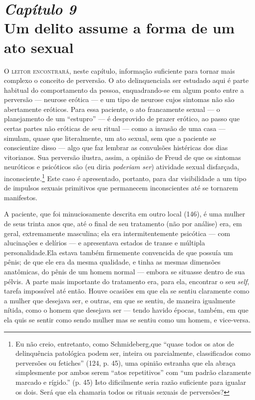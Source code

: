 \chapter[\textbf{9}\quad Um delito assume a forma de um ato sexual]{{\large\textit{Capítulo 9}}\\ Um delito assume a forma de um ato sexual}


\textsc{O leitor encontrará,} neste capítulo, informação suficiente para tornar
mais complexo o conceito de perversão. O ato delinquencial\idxcrime[|(] a ser
estudado aqui é parte habitual do comportamento da pessoa,
enquadrando-se em algum ponto entre a perversão --- neurose\idxneuro{} erótica
 --- e um tipo de neurose\idxpervneuro{} cujos sintomas não são abertamente eróticos.
Para essa paciente, o ato francamente sexual --- o planejamento de
um ``estupro''\idxestup{} --- é desprovido de prazer
erótico, ao passo que certas partes não eróticas de seu ritual ---
como a invasão de uma casa --- simulam, quase que literalmente, um ato
sexual, sem que a paciente se conscientize disso --- algo que faz
lembrar as convulsões histéricas dos dias vitorianos. Sua perversão
ilustra, assim, a opinião de Freud\idxfreud{} de que os sintomas neuróticos e
psicóticos são (eu diria \textit{poderiam ser}) atividade sexual
disfarçada, inconsciente.\footnote{ Eu não creio, entretanto, como
Schmideberg,\idxschmid[|nn] que ``quase todos os atos de delinquência
patológica podem ser, inteira ou parcialmente, classificados como
perversões ou fetiches'' (124, p. 45), uma opinião
estranha que ela abraça simplesmente por ambos serem
``atos repetitivos'' com ``um
padrão claramente marcado e rígido.'' (p. 45) Isto
dificilmente seria razão suficiente para igualar os dois. Será que ela
chamaria todos os rituais sexuais de perversões?} Este caso é
apresentado, portanto, para dar visibilidade a um tipo de impulsos
sexuais primitivos que permanecem inconscientes até se tornarem
manifestos.

A paciente, que foi minuciosamente descrita em outro local (146), é
uma mulher de seus trinta anos que, até o final de seu tratamento (não
por análise) era, em geral, extremamente masculina; ela era
intermitentemente psicótica --- com alucinações\idxaluci{} e delírios --- e
apresentava estados de transe e múltipla personalidade.\idxmultp[|(] Ela estava
também firmemente convencida de que possuía um pênis; de que ele era da
mesma qualidade, e tinha as mesmas dimensões anatômicas, do pênis de um
homem normal --- embora se situasse dentro de sua pélvis. A parte mais
importante do tratamento era, para ela, encontrar o seu \textit{self},
tarefa impossível até então. Houve ocasiões em que ela se sentiu
claramente como a mulher que desejava ser, e outras, em que se sentiu,
de maneira igualmente nítida, como o homem que desejava ser --- tendo
havido épocas, também, em que ela quis se sentir como sendo mulher mas
se sentiu como um homem, e vice-versa.

